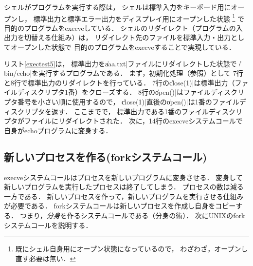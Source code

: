 シェルがプログラムを実行する際は，
シェルは標準入力をキーボード用にオープンし，
標準出力と標準エラー出力をディスプレイ用にオープンした状態
\footnote{
  既にシェル自身用にオープン状態になっているので，
  わざわざ，オープンし直す必要は無い．}
で目的のプログラムをexecveしている．
シェルのリダイレクト（プログラムの入出力を切替える仕組み）は，
リダイレクト先のファイルを標準入力・出力としてオープンした状態で
目的のプログラムをexecveすることで実現している．



リスト\ref{exectest5}は，
標準出力を\|aaa.txt|ファイルにリダイレクトした状態で
\|/bin/echo|を実行するプログラムである．
まず，初期化処理（参照）として
7行と8行で標準出力のリダイレクトを行っている．
7行の\|close(1)|は標準出力（ファイルディスクリプタ1番）をクローズする．
8行の\|open()|はファイルディスクリプタ番号を小さい順に使用するので，
\|close(1)|直後の\|open()|は1番のファイルディスクリプタを返す．
ここまでで，
標準出力である1番のファイルディスクリプタがファイルにリダイレクトされた．
次に，14行のexecveシステムコールで自身がechoプログラムに変身する．

\subsection{新しいプロセスを作る(forkシステムコール)}
execveシステムコールはプロセスを新しいプログラムに変身させる．
変身して新しいプログラムを実行したプロセスは終了してしまう．
プロセスの数は減る一方である．
新しいプロセスを作って，新しいプログラムを実行させる仕組みが必要である．
forkシステムコールは新しいプロセスを作成し自身をコピーする．
つまり，\emph{分身}を作るシステムコールである（分身の術）．
次にUNIXのforkシステムコールを説明する．

